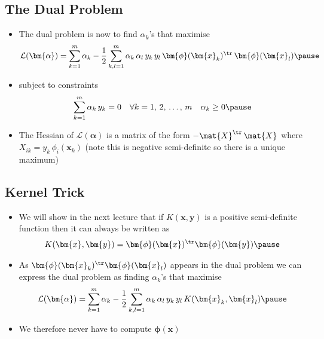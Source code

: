 \begin{slide}
\section{The Dual Problem}

\begin{PauseHighLight}
  \begin{itemize}
  \item The dual problem is now to find $\alpha_k$'s that maximise
    \begin{align*}
      \mathcal{L}(\bm{\alpha}) = \sum_{k=1}^m \alpha_k 
      - \frac{1}{2} \sum_{k,l=1}^m \alpha_k\,\alpha_l
      \,y_k\,y_l\,\bm{\phi}(\bm{x}_k)^\tr\, \bm{\phi}(\bm{x}_l)\pause
    \end{align*}
  \item subject to constraints
    \begin{align*}
      \sum_{k=1}^m \alpha_k\, y_k
      &= 0
      & \forall k=1,\,2,\,\ldots,\, m \quad \alpha_k \geq 0\pause
    \end{align*}
  \item The Hessian of $\mathcal{L}(\bm{\alpha})$ is a matrix of the
    form $- \mat{X}^\tr\, \mat{X}$ where $X_{ik} = y_k\,
    \phi_i(\bm{x}_k)$\pause{} (note this is negative semi-definite
    so there is a unique maximum)\pauseb
  \end{itemize}
\end{PauseHighLight}

\end{slide}


\begin{slide}
\section{Kernel Trick}

\begin{PauseHighLight}
  \begin{itemize}
  \item We will show in the next lecture that if $K(\bm{x},\bm{y})$ is
    a positive semi-definite function then it can always be written as
    \begin{align*}
      K(\bm{x},\bm{y}) = \bm{\phi}(\bm{x})^\tr\bm{\phi}(\bm{y})\pause
    \end{align*}
  \item As $\bm{\phi}(\bm{x}_k)^\tr\bm{\phi}(\bm{x}_l)$ appears in the
    dual problem we can express the dual problem as finding
    $\alpha_k$'s that maximise
    \begin{align*}
      \mathcal{L}(\bm{\alpha}) = \sum_{k=1}^m \alpha_k 
      - \frac{1}{2} \sum_{k,l=1}^m \alpha_k\,\alpha_l
      \,y_k\,y_l\,K(\bm{x}_k,\bm{x}_l)\pause
    \end{align*}
  \item We therefore never have to compute $\bm{\phi}(\bm{x})$\pause
  \end{itemize}
\end{PauseHighLight}

\end{slide}


